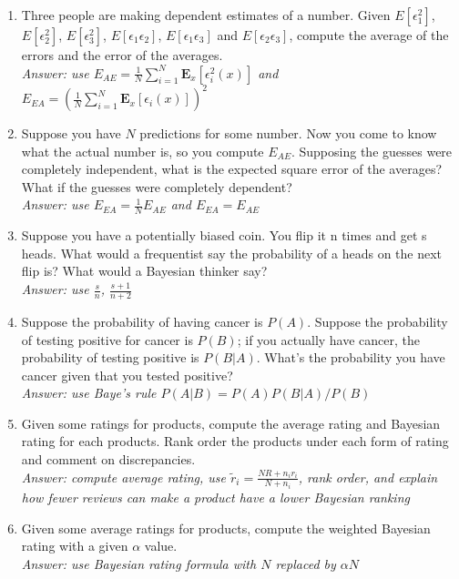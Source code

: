 \documentclass{article}
\begin{document}
\begin{enumerate}
\item Three people are making dependent estimates of a number. Given $E[\epsilon_1^2]$, $E[\epsilon_2^2]$, $E[\epsilon_3^2]$, $E[\epsilon_1\epsilon_2]$, $E[\epsilon_1\epsilon_3]$ and $E[\epsilon_2\epsilon_3]$, compute the average of the errors and the error of the averages. \\
\textit{Answer: use $E_{AE} = \frac{1}{N}\sum_{i=1}^{N}\textbf{E}_x[\epsilon_i^2(x)]$ and $E_{EA} = \left( \frac{1}{N}\sum_{i=1}^{N}\textbf{E}_x[\epsilon_i(x)] \right)^2$}
\item Suppose you have $N$ predictions for some number. Now you come to know what the actual number is, so you compute $E_{AE}$. Supposing the guesses were completely independent, what is the expected square error of the averages? What if the guesses were completely dependent? \\
\textit{Answer: use $E_{EA} = \frac{1}{N} E_{AE}$ and $E_{EA} = E_{AE}$}
\item Suppose you have a potentially biased coin. You flip it n times and get s heads. What would a frequentist say the probability of a heads on the next flip is? What would a Bayesian thinker say? \\
\textit{Answer: use $\frac{s}{n}$, $\frac{s+1}{n+2}$}
\item Suppose the probability of having cancer is $P(A)$. Suppose the probability of testing positive for cancer is $P(B)$; if you actually have cancer, the probability of testing positive is $P(B|A)$. What's the probability you have cancer given that you tested positive? \\
\textit{Answer: use Baye's rule $P(A|B) = P(A)P(B|A)/P(B)$}
\item Given some ratings for products, compute the average rating and Bayesian rating for each products. Rank order the products under each form of rating and comment on discrepancies. \\
\textit{Answer: compute average rating, use $\tilde{r}_i = \frac{NR + n_ir_i}{N + n_i}$, rank order, and explain how fewer reviews can make a product have a lower Bayesian ranking}
\item Given some average ratings for products, compute the weighted Bayesian rating with a given $\alpha$ value. \\
\textit{Answer: use Bayesian rating formula with $N$ replaced by $\alpha N$}
\end{enumerate}

\end{document}
